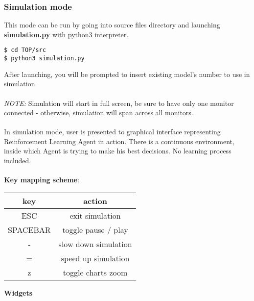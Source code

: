 \documentclass{article}
\begin{document}
\subsubsection{Simulation mode}
This mode can be run by going into source files directory and launching \textbf{simulation.py}
 with python3 interpreter. 
\begin{lstlisting}
$ cd TOP/src
$ python3 simulation.py
\end{lstlisting}
After launching, you will be prompted to insert existing model's number to use in simulation. 
\\\\
\textit{NOTE:} Simulation will start in full screen, be sure to have only one monitor connected - otherwise, simulation will span across all monitors.
\\\\
In simulation mode, user is presented to graphical interface representing Reinforcement Learning
Agent in action. 
There is a continuous environment, inside which Agent is trying to make his best decisions. No
learning process included.  \\\\
\textbf{Key mapping scheme}: \\
\begin{center}
\begin{tabular}{c | c }
\textbf{key} & \textbf{action} \\ \hline
ESC & exit simulation \\ \hline
SPACEBAR & toggle pause / play \\ \hline
- & slow down simulation \\ \hline
= & speed up simulation \\ \hline
z & toggle charts zoom \\ 
\end{tabular}
\end{center}
\textbf{Widgets}
\end{document}
